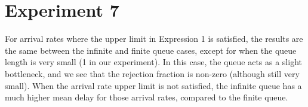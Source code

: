 \section*{Experiment 7}
For arrival rates where the upper limit in Expression 1 is satisfied, the results are the same between the infinite and finite queue cases, except for when the queue length is very small (1 in our experiment).
In this case, the queue acts as a slight bottleneck, and we see that the rejection fraction is non-zero (although still very small).
When the arrival rate upper limit is not satisfied, the infinite queue has a much higher mean delay for those arrival rates, compared to the finite queue.
